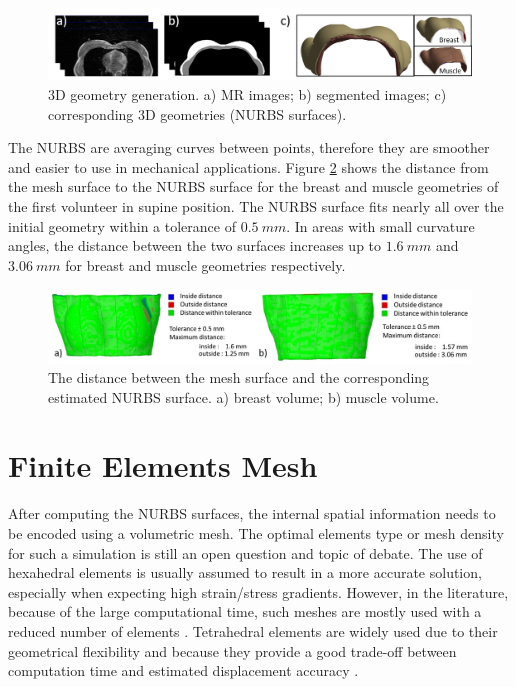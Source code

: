 \begin{figure}[!h]
\centering
\includegraphics[width=\textwidth,keepaspectratio]{figures/3dgeometries.png} 
\caption{3D geometry generation. a) MR images; b) segmented images; c) corresponding 3D geometries (NURBS surfaces).} \label{fig:3dgeometries}
\end{figure}

The NURBS are averaging curves between points, therefore they are smoother and easier to use in mechanical applications. Figure \ref{fig:nurbsVSsurfaceMeshError} shows the distance from the mesh surface to the NURBS surface for the breast and muscle geometries of the first volunteer in supine position. The NURBS surface fits nearly all over the initial geometry within a tolerance of $0.5\ mm$. In areas with small curvature angles, the distance between the two surfaces increases up to $1.6\ mm$ and $3.06\ mm$ for breast and muscle geometries respectively.
 
\begin{figure}[!h]
\centering
\includegraphics[width=\textwidth,keepaspectratio]{figures/nurbsVSsurfaceMeshError.jpg} 
\caption{The distance between the mesh surface and the corresponding estimated NURBS surface. a) breast volume; b) muscle volume.} \label{fig:nurbsVSsurfaceMeshError}
\end{figure}


\section{ Finite Elements Mesh}\label{section:myFEM}

After computing the NURBS surfaces, the internal spatial information needs to be encoded using a volumetric mesh. The optimal elements type or mesh density for such a simulation is still an open question and topic of debate. The use of hexahedral elements is usually assumed to result in a more accurate solution, especially when expecting high strain/stress gradients. However, in the literature, because of the large computational time, such meshes are mostly used with a reduced number of elements \citep{ruiter_model_based_2006,gamage_modelling_2012}. Tetrahedral elements are widely used due to their geometrical flexibility and because they provide a good trade-off between computation time and estimated displacement accuracy \citep{han_nonlinear_2014,palomar_finite_2008,griesenauer_breast_2017}.   

